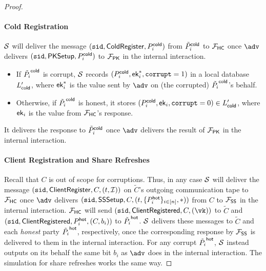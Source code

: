\begin{proof}
\paragraph{Cold Registration} $\mathcal{S}$ will deliver the message $(\texttt{sid}, \mathsf{ColdRegister}, P_i^{\mathsf{cold}})$ from $\tilde{P}_i^{\mathsf{cold}}$ to $\mathcal{F}_\mathsf{HC}$ once $\adv$ delivers $(\texttt{sid}, \mathsf{PKSetup}, P_i^{\mathsf{cold}})$ to $\mathcal{F}_\mathsf{PK}$ in the internal interaction.
\begin{itemize}
    \item If $\tilde{P_i}^{\mathsf{cold}}$ is corrupt, $\mathcal{S}$ records $(P_i^{\mathsf{cold}}, \mathsf{ek}_i^*, \texttt{corrupt} = 1)$ in a local database $L_{\mathsf{cold}}'$, where $\mathsf{ek}_i^*$ is the value sent by $\adv$ on (the corrupted) $\tilde{P_i}^{\mathsf{cold}}$'s behalf.
    \item Otherwise, if $\tilde{P_i}^{\mathsf{cold}}$ is honest, it stores $(P_i^{\mathsf{cold}}, \mathsf{ek}_i, \texttt{corrupt} = 0) \in L_{\mathsf{cold}}'$, where $\mathsf{ek}_i$ is the value from $\mathcal{F}_\mathsf{HC}$'s response.
\end{itemize}
It delivers the response to $\tilde{P}_i^{\mathsf{cold}}$ once $\adv$ delivers the result of $\mathcal{F}_\mathsf{PK}$ in the internal interaction. 

\paragraph{Client Registration and Share Refreshes}
Recall that $C$ is out of scope for corruptions. Thus, in any case $\mathcal{S}$ will deliver the message $(\texttt{sid}, \mathsf{ClientRegister}, C,\allowbreak (t, \mathcal{I}))$ on $\tilde{C}$'s outgoing communication tape to $\mathcal{F}_\mathsf{HC}$ once $\adv$ delivers $(\sid,\break \mathsf{SSSetup}, C, (t, \{P_i^\hot\}_{i \in [n]}, *))$ from $C$ to $\mathcal{F}_\mathsf{SS}$ in the internal interaction. $\mathcal{F}_\mathsf{HC}$ will send $(\sid, \mathsf{ClientRegistered}, C, (\vk))$ to $\tilde{C}$ and $(\texttt{sid},\allowbreak \mathsf{ClientRegistered}, P_i^{\mathsf{hot}}, (C, b_i))$ to $\tilde{P_i}^{\mathsf{hot}}$. $\mathcal{S}$ delivers these messages to $\tilde{C}$ and each \emph{honest} party $\tilde{P_i}^{\mathsf{hot}}$, respectively, once the corresponding response by $\mathcal{F}_\mathsf{SS}$ is delivered to them in the internal interaction.
For any corrupt $\tilde{P_i}^{\mathsf{hot}}$, $\mathcal{S}$ instead outputs on its behalf the same bit $b_i$ as $\adv$ does in the internal interaction. The simulation for share refreshes works the same way.


\end{proof}
